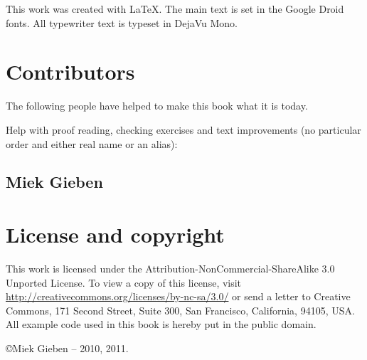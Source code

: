 \noindent{}This work was created with \LaTeX. The main text is set in
the Google Droid fonts. All typewriter text is typeset in DejaVu Mono.

\section{Contributors}
The following people have helped to make this book what it is today.
\begin{itemize}
\item{Miek Gieben \qquad\url{<miek@miek.nl>}};
\item{JC van Winkel;
\item{Mike Spook}, Chinese translation.
\end{itemize}

Help with proof reading, checking exercises and text improvements (no
particular order and either real name or an alias):


\subsection{Miek Gieben}


\section{License and copyright}
This work is licensed under the Attribution-NonCommercial-ShareAlike 3.0 Unported License. To
view a copy of this license, visit \url{http://creativecommons.org/licenses/by-nc-sa/3.0/}
or send a letter to Creative Commons, 171 Second Street, Suite 300, San
Francisco, California, 94105, USA.\newline
All example code used in this book is hereby put in the public domain.

\copyright Miek Gieben -- 2010, 2011.
